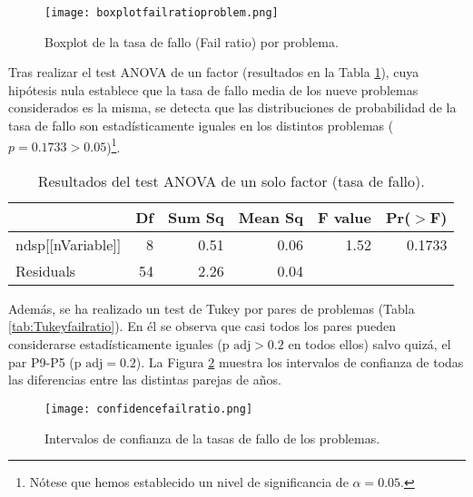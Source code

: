 \begin{figure}[H]
    \centering
    \texttt{[image: boxplotfailratioproblem.png]}
    \caption{Boxplot de la tasa de fallo (Fail ratio) por problema.}
    \label{fig:boxplotfailratio}
\end{figure}

Tras realizar el test ANOVA de un factor (resultados en la Tabla \ref{tab:ANOVAfailratio}), cuya hipótesis nula establece que la tasa de fallo media de los nueve problemas considerados es la misma, se detecta que las distribuciones de probabilidad de la tasa de fallo son estadísticamente iguales en los distintos problemas ($p = 0.1733 > 0.05$)\footnote{Nótese que hemos establecido un nivel de significancia de $\alpha = 0.05$.}.

\begin{table}[H]
\centering
\caption{Resultados del test ANOVA de un solo factor (tasa de fallo).}
\label{tab:ANOVAfailratio}
\begin{tabular}{lrrrrr}
  \hline
 & Df & Sum Sq & Mean Sq & F value & Pr($>$F) \\ 
  \hline
ndsp[[nVariable]] & 8 & 0.51 & 0.06 & 1.52 & 0.1733 \\ 
  Residuals         & 54 & 2.26 & 0.04 &  &  \\ 
   \hline
\end{tabular}
\end{table}

Además, se ha realizado un test de Tukey por pares de problemas (Tabla \ref{tab:Tukeyfailratio}). En él se observa que casi todos los pares pueden considerarse estadísticamente iguales ($\text{p adj} > 0.2$ en todos ellos) salvo quizá, el par P9-P5 ($\text{p adj} = 0.2$). La Figura \ref{fig:confidenceratiofail} muestra los intervalos de confianza de todas las diferencias entre las distintas parejas de años.

\begin{figure}[H]
    \centering
    \texttt{[image: confidencefailratio.png]}
    \caption{Intervalos de confianza de la tasas de fallo de los problemas.}
    \label{fig:confidenceratiofail}
\end{figure}


